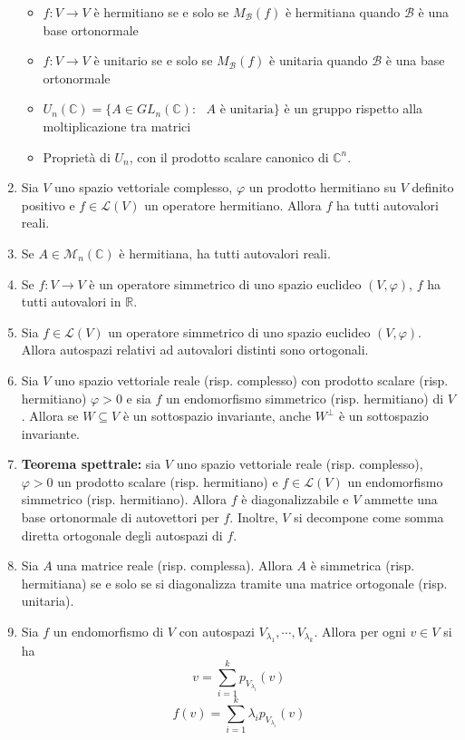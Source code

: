 \documentclass[a4paper,11pt]{article}
\begin{document}
\begin{enumerate}[resume]
\begin{itemize}
		\item $f\colon V\to V$ è hermitiano se e solo se $M_\mathcal{B}(f)$ è hermitiana quando $\mathcal{B}$ è una base ortonormale
		\item $f\colon V\to V$ è unitario se e solo se $M_\mathcal{B}(f)$ è unitaria quando $\mathcal{B}$ è una base ortonormale
		\item $U_n(\mathbb{C})=\{A\in GL_n(\mathbb{C}):\textrm{ $A$ è unitaria}\}$ è un gruppo rispetto alla moltiplicazione tra matrici
		\item Proprietà di $U_n$, con il prodotto scalare canonico di $\mathbb{C}^n$.
	\end{itemize}
	\item Sia $V$ uno spazio vettoriale complesso, $\varphi$ un prodotto hermitiano su $V$ definito positivo e $f\in\mathcal{L}(V)$ un operatore hermitiano. Allora $f$ ha tutti autovalori reali.
	\item Se $A\in\mathcal{M}_n(\mathbb{C})$ è hermitiana, ha tutti autovalori reali.
	\item Se $f\colon V\to V$ è un operatore simmetrico di uno spazio euclideo $(V,\varphi)$, $f$ ha tutti autovalori in $\mathbb{R}$.
	\item Sia $f\in\mathcal{L}(V)$ un operatore simmetrico di uno spazio euclideo $(V,\varphi)$. Allora autospazi relativi ad autovalori distinti sono ortogonali.
	\item Sia $V$ uno spazio vettoriale reale (risp. complesso) con prodotto scalare (risp. hermitiano) $\varphi>0$ e sia $f$ un endomorfismo simmetrico (risp. hermitiano) di $V$. Allora se $W\subseteq V$ è un sottospazio invariante, anche $W^\perp$ è un sottospazio invariante.
	\item\textbf{Teorema spettrale:} sia $V$ uno spazio vettoriale reale (risp. complesso), $\varphi>0$ un prodotto scalare (risp. hermitiano) e $f\in\mathcal{L}(V)$ un endomorfismo simmetrico (risp. hermitiano). Allora $f$ è diagonalizzabile e $V$ ammette una base ortonormale di autovettori per $f$. Inoltre, $V$ si decompone come somma diretta ortogonale degli autospazi di $f$.
	\item Sia $A$ una matrice reale (risp. complessa). Allora $A$ è simmetrica (risp. hermitiana) se e solo se si diagonalizza tramite una matrice ortogonale (risp. unitaria).
	\item Sia $f$ un endomorfismo di $V$ con autospazi $V_{\lambda_1},\cdots,V_{\lambda_k}$. Allora per ogni $v\in V$ si ha
	\[v=\sum_{i=1}^{k}p_{V_{\lambda_i}}(v)\]
	\[f(v)=\sum_{i=1}^{k}\lambda_i p_{V_{\lambda_i}}(v)\]

\end{enumerate}
\end{document}

